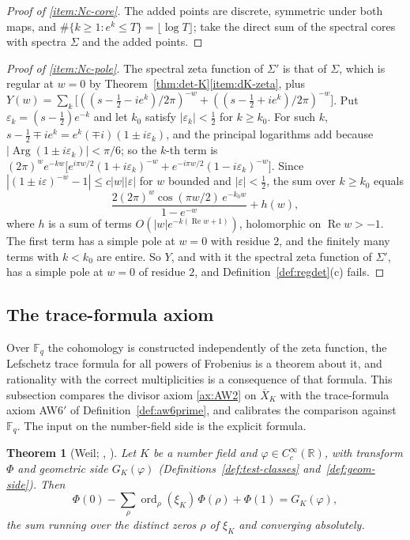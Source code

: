 \documentclass[11pt]{amsart}
\theoremstyle{plain}
\newtheorem{theorem}{Theorem}[section]
\theoremstyle{definition}
\theoremstyle{remark}
\numberwithin{equation}{section}
\newcommand{\R}{\mathbb{R}}
\newcommand{\F}{\mathbb{F}}
\newcommand{\Xbar}{\overline{X}}
\DeclareMathOperator{\Rea}{Re}
\DeclareMathOperator{\ord}{ord}
\renewcommand{\Re}{\Rea}
\begin{document}
\begin{proof}[Proof of \ref{item:Nc-core}]
The added points are discrete, symmetric under both maps, and
$\#\{k\ge1:e^k\le T\}=\lfloor\log T\rfloor$; take the direct sum of
the spectral cores with spectra $\Sigma$ and the added points.
\end{proof}

\begin{proof}[Proof of \ref{item:Nc-pole}]
The spectral zeta function of $\Sigma'$ is that of $\Sigma$, which is
regular at $w=0$ by Theorem~\ref{thm:det-K}\ref{item:dK-zeta}, plus
$Y(w)=\sum_k\bigl[((s-\frac12-ie^k)/2\pi)^{-w}
+((s-\frac12+ie^k)/2\pi)^{-w}\bigr]$. Put
$\varepsilon_k=(s-\tfrac12)e^{-k}$ and let $k_0$ satisfy
$|\varepsilon_k|<\tfrac12$ for $k\ge k_0$. For such $k$,
$s-\tfrac12\mp ie^k=e^k(\mp i)(1\pm i\varepsilon_k)$, and the principal
logarithms add because $|\operatorname{Arg}(1\pm i\varepsilon_k)|<\pi/6$;
so the $k$-th term is
$(2\pi)^we^{-kw}\bigl[e^{i\pi w/2}(1+i\varepsilon_k)^{-w}
+e^{-i\pi w/2}(1-i\varepsilon_k)^{-w}\bigr]$. Since
$|(1\pm i\varepsilon)^{-w}-1|\le c|w||\varepsilon|$ for $w$ bounded and
$|\varepsilon|<\tfrac12$, the sum over $k\ge k_0$ equals
\[
\frac{2(2\pi)^w\cos(\pi w/2)\,e^{-k_0w}}{1-e^{-w}}+h(w),
\]
where $h$ is a sum of terms $O(|w|e^{-k(\Re w+1)})$, holomorphic on
$\Re w>-1$. The first term has a simple pole at $w=0$ with residue $2$,
and the finitely many terms with $k<k_0$ are entire. So $Y$, and with it
the spectral zeta function of $\Sigma'$, has a simple pole at $w=0$ of
residue $2$, and Definition~\ref{def:regdet}(c) fails.
\end{proof}


\subsection{The trace-formula axiom}\label{subsec:trace-axiom}

Over $\F_q$ the cohomology is constructed independently of the zeta
function, the Lefschetz trace formula for all powers of Frobenius is a
theorem about it, and rationality with the correct multiplicities is a
consequence of that formula. This subsection compares the divisor axiom
\ref{ax:AW2} on $\Xbar_K$ with the trace-formula axiom AW6$'$ of
Definition~\ref{def:aw6prime}, and calibrates the comparison against
$\F_q$. The input on the number-field side is the explicit formula.

\begin{theorem}[{Weil; \cite[Theorem~4.1, (17), p.~15]%
{Deninger2001NumberTheory}, \cite[(1), p.~1]{Deninger2002Explicit}}]
\label{thm:imp-explicit}
Let $K$ be a number field and $\varphi\in C_c^\infty(\R)$, with
transform $\Phi$ and geometric side $G_K(\varphi)$
(Definitions~\ref{def:test-classes} and~\ref{def:geom-side}). Then
\[
\Phi(0)-\sum_\rho\ord_\rho(\xi_K)\,\Phi(\rho)+\Phi(1)=G_K(\varphi),
\]
the sum running over the distinct zeros $\rho$ of $\xi_K$ and
converging absolutely.
\end{theorem}
\end{document}
